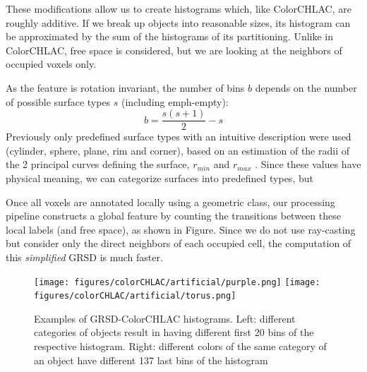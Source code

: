 \documentclass[conference]{sty/IEEEtran}
\begin{document}
These modifications allow us to create histograms which, like ColorCHLAC, are roughly additive.
If we break up objects into reasonable sizes, its histogram can be approximated by the sum of the
histograms of its partitioning. Unlike in ColorCHLAC, free space is considered, but we are looking
at the neighbors of occupied voxels only.

As the feature is rotation invariant, the number of bins $b$ depends on the number of possible surface types $s$ (including emph-empty):
\begin{equation}
b=\frac{s(s+1)}{2}-s
\end{equation}
Previously only predefined surface types with an intuitive description were used (cylinder, sphere, plane, rim and corner),
based on an estimation of the radii of the 2 principal curves defining the surface, $r_{min}$ and $r_{max}$ \cite{Marton10IROS}.
Since these values have physical meaning, we can categorize surfaces into predefined types, but

Once all voxels are annotated locally using a geometric class, our
processing pipeline constructs a global feature by counting the transitions
between these local labels (and free space), as shown in Figure\todo{~\ref{fig:grsd}}.
Since we do not use ray-casting but consider only the direct neighbors
of each occupied cell, the computation of this \emph{simplified} GRSD is much faster.

\begin{figure}[htb!]
  \begin{center}
    \texttt{[image: figures/colorCHLAC/artificial/purple.png]}
    \texttt{[image: figures/colorCHLAC/artificial/torus.png]}
    \caption{Examples of GRSD-ColorCHLAC histograms. Left: different categories
of objects result in having different first 20 bins of the respective histogram.
Right: different colors of the same category of an object have different 137 last bins
of the histogram}
    \label{fig:grsd_cchlac}
  \end{center}
\end{figure}
\end{document}
